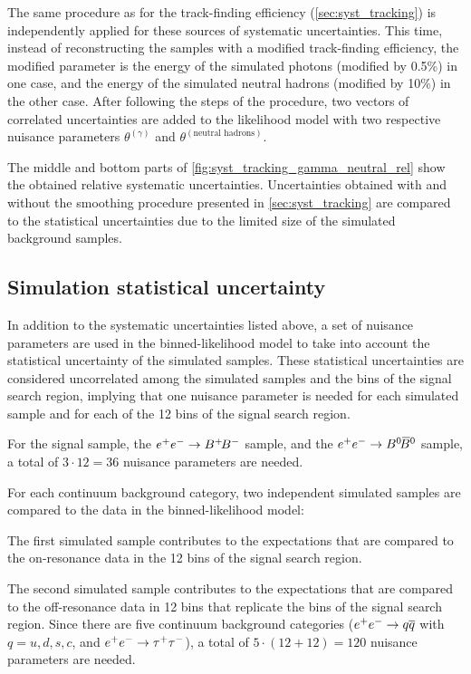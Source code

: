The same procedure as for the track-finding efficiency (\cref{sec:syst_tracking}) is independently applied for these sources of systematic uncertainties.
This time, instead of reconstructing the samples with a modified track-finding efficiency, the modified parameter is the energy of the simulated photons (modified by 0.5\%) in one case, and the energy of the simulated neutral hadrons (modified by 10\%) in the other case.
After following the steps of the procedure, two vectors of correlated uncertainties are added to the likelihood model with two respective nuisance parameters $\theta^{(\gamma)}$ and $\theta^{(\text{neutral hadrons})}$.

The middle and bottom parts of \cref{fig:syst_tracking_gamma_neutral_rel} show the obtained relative systematic uncertainties.
Uncertainties obtained with and without the smoothing procedure presented in \cref{sec:syst_tracking} are compared to the statistical uncertainties due to the limited size of the simulated background samples.
\subsection{Simulation statistical uncertainty} \label{sec:syst_mcstat}
In addition to the systematic uncertainties listed above, a set of nuisance parameters are used in the binned-likelihood model to take into account the statistical uncertainty of the simulated samples.
These statistical uncertainties are considered uncorrelated among the simulated samples and the bins of the signal search region, implying that one nuisance parameter is needed for each simulated sample and for each of the 12 bins of the signal search region.

For the signal sample, the $e^+e^-\rightarrow B^+ {\kern -0.16em B^-}$ sample, and the $\epem\to\BzBzb$ sample, a total of $3\cdot12=36$ nuisance parameters are needed.

For each continuum background category, two independent simulated samples are compared to the data in the binned-likelihood model:
\bi
\item The first simulated sample contributes to the expectations that are compared to the on-resonance data in the 12 bins of the signal search region.
\item The second simulated sample contributes to the expectations that are compared to the off-resonance data in 12 bins that replicate the bins of the signal search region.
\ei
Since there are five continuum background categories ($e^+e^-\rightarrow q\overline q$ with $q=u,d,s,c$, and $e^+e^-\rightarrow\tau^+\tau^-$), a total of $5\cdot(12+12)=120$ nuisance parameters are needed.

